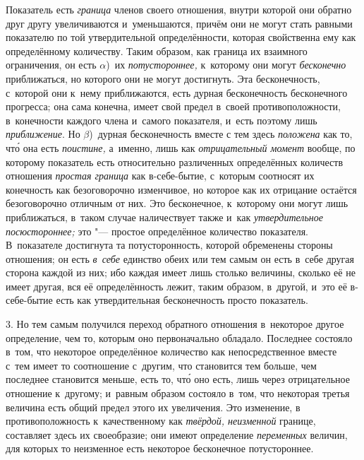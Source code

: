 Показатель есть {\em граница} членов своего отношения, внутри которой они
обратно друг другу увеличиваются и~уменьшаются, причём они не могут стать
равными показателю по той утвердительной определённости, которая свойственна
ему как определённому количеству. Таким образом, как граница их взаимного
ограничения, он есть $\alpha$)~их {\em потустороннее,} к~которому они могут
{\em бесконечно} приближаться, но которого они не могут достигнуть. Эта
бесконечность, с~которой они к~нему приближаются, есть дурная бесконечность
бесконечного прогресса; она сама конечна, имеет свой предел в~своей
противоположности, в~конечности каждого члена и~самого показателя, и~есть
поэтому лишь {\em приближение}. Но $\beta$)~дурная бесконечность вместе
с тем здесь {\em положена} как то, чт\'{о} она есть {\em поистине,} а~именно,
лишь как {\em отрицательный момент} вообще, по которому показатель есть
относительно различенных определённых количеств отношения {\em простая граница}
как в-себе-бытие, с~которым соотносят их конечность как безоговорочно
изменчивое, но которое как их отрицание остаётся безоговорочно отличным от них.
Это бесконечное, к~которому они могут лишь приближаться, в~таком случае
наличествует также и~как {\em утвердительное посюстороннее;} это "--- простое
определённое количество показателя. В~показателе достигнута та потусторонность,
которой обременены стороны отношения; он есть {\em в~себе} единство обеих или
тем самым он есть в~себе другая сторона каждой из них; ибо каждая имеет лишь
столько величины, сколько её не имеет другая, вся её определённость лежит,
таким образом, в~другой, и~это её в-себе-бытие есть как утвердительная
бесконечность просто показатель.

3. Но тем самым получился переход обратного отношения в~некоторое другое
определение, чем то, которым оно первоначально обладало. Последнее состояло
в~том, что некоторое определённое количество как непосредственное вместе с~тем
имеет то соотношение с~другим, что становится тем больше, чем последнее
становится меньше, есть то, чт\'{о} оно есть, лишь через отрицательное
отношение к~другому; и~равным образом состояло в~том, что некоторая третья
величина есть общий предел этого их увеличения. Это изменение, в
противоположность к~качественному как {\em твёрдой, неизменной} границе,
составляет здесь их своеобразие; они имеют определение {\em переменных}
величин, для которых то неизменное есть некоторое бесконечное потустороннее.

